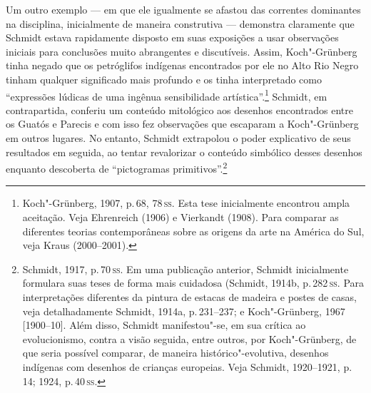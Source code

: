 Um outro exemplo --- em que ele igualmente se afastou das correntes
dominantes na disciplina, inicialmente de maneira construtiva ---
demonstra claramente que Schmidt estava rapidamente disposto em suas
exposições a usar observações iniciais para conclusões muito abrangentes
e discutíveis. Assim, Koch"-Grünberg tinha negado que os petróglifos
indígenas encontrados por ele no Alto Rio Negro tinham qualquer
significado mais profundo e os tinha interpretado como ``expressões
lúdicas de uma ingênua sensibilidade artística''.\footnote{Koch"-Grünberg,
  1907, p.\,68, 78\,\textsc{ss}. Esta tese inicialmente encontrou ampla aceitação.
  Veja Ehrenreich (1906) e Vierkandt (1908). Para comparar as
  diferentes teorias contemporâneas sobre as origens da arte na América
  do Sul, veja Kraus (2000--2001).} Schmidt, em contrapartida, conferiu
um conteúdo mitológico aos desenhos encontrados entre os Guatós e Parecis
e com isso fez observações que escaparam a Koch"-Grünberg em outros
lugares. No entanto, Schmidt extrapolou o poder explicativo de seus
resultados em seguida, ao tentar revalorizar o conteúdo simbólico
desses desenhos enquanto descoberta de ``pictogramas
primitivos''.\footnote{Schmidt, 1917, p.\,70\,\textsc{ss}. %
  Em uma publicação anterior, Schmidt inicialmente formulara suas teses
  de forma mais cuidadosa (Schmidt, 1914b, p.\,282\,\textsc{ss}. Para
  interpretações diferentes da pintura de estacas de madeira e postes de
  casas, veja detalhadamente Schmidt, 1914a, p.\,231--237; e Koch"-Grünberg,
  1967 {[}1900--10{]}. Além disso, Schmidt manifestou"-se, em sua
  crítica ao evolucionismo, contra a visão seguida, entre outros, por
  Koch"-Grünberg, de que seria possível comparar, de maneira
  histórico"-evolutiva, desenhos indígenas com desenhos de crianças
  europeias. Veja Schmidt, 1920--1921, p.\,14; 1924, p.\,40\,\textsc{ss}.}


